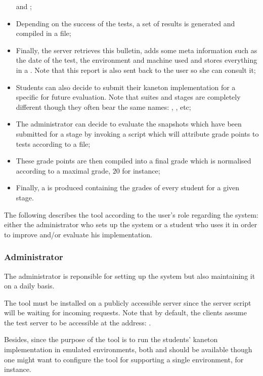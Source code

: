 \begin{itemize}
    and ;
  \item
    Depending on the success of the tests, a set of results is generated
    and compiled in a  file;
  \item
    Finally, the server retrieves this bulletin, adds some meta information
    such as the date of the test, the environment and machine used \etc{}
    and stores everything in a . Note that this report is
    also sent back to the user so she can consult it;
  \item
    Students can also decide to submit their kaneton implementation for
    a specific  for future evaluation. Note that suites and
    stages are completely different though they often bear the same names:
    , ,  etc{};
  \item
    The administrator can decide to evaluate the snapshots which have been
    submitted for a stage by invoking a script which will attribute grade
    points to tests according to a  file;
  \item
    These grade points are then compiled into a final grade which is
    normalised according to a  maximal grade, $20$ for
    instance;
  \item
    Finally, a  is produced containing the grades of every
    student for a given stage.
\end{itemize}

The following describes the  tool according to the user's role
regarding the system: either the administrator who sets up the system or
a student who uses it in order to improve and/or evaluate his implementation.

%
%
\subsubsection{Administrator}

The administrator is reponsible for setting up the system but also maintaining
it on a daily basis.


The  tool must be installed on a publicly accessible server since
the server script will be waiting for incoming requests. Note that by default,
the clients assume the test server to be accessible at the address:
.

Besides, since the purpose of the  tool is to run the students'
kaneton implementation in emulated environments, both  and
 should be available though one might want to configure the tool
for supporting a single environment,  for instance.

